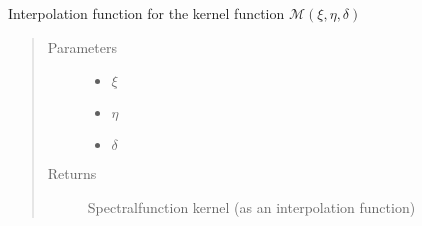 \documentclass[letterpaper,10pt,english]{sphinxmanual}
\begin{document}
\begin{fulllineitems}
\label{\detokenize{diffsph.spectra:diffsph.spectra.synchrotron.Mst}}
\sphinxAtStartPar
Interpolation function for the kernel function \(\hat{\mathcal M}(\xi,\eta,\delta)\)
\begin{quote}\begin{description}
\item[{Parameters}] \leavevmode\begin{itemize}
\item {} 
\sphinxAtStartPar
{} \textendash{} \(\xi\)

\item {} 
\sphinxAtStartPar
{} \textendash{} \(\eta\)

\item {} 
\sphinxAtStartPar
{} \textendash{} \(\delta\)

\end{itemize}

\item[{Returns}] \leavevmode
\sphinxAtStartPar
Spectral\sphinxhyphen{}function kernel (as an interpolation function)

\end{description}\end{quote}

\end{fulllineitems}

\end{document}
